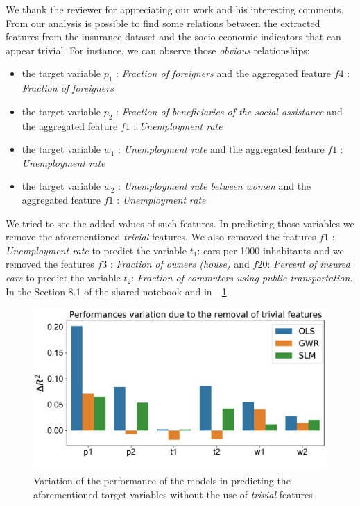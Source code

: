 \documentclass[12pt]{article}
\begin{document}
We thank the reviewer for appreciating our work and his interesting comments. From our analysis is possible to find some relations between the extracted features from the insurance dataset and the socio-economic indicators that can appear trivial. For instance, we can observe those \emph{obvious} relationships:

\begin{itemize}
\item the target variable $p_1$ : \emph{Fraction of foreigners} and the aggregated feature $f4$ : \emph{Fraction of foreigners}
\item the target variable $p_2$ : \emph{Fraction of beneficiaries of the social assistance} and the aggregated feature $f1$ : \emph{Unemployment rate}
\item  the target variable $w_1$ : \emph{Unemployment rate} and the aggregated feature $f1$ : \emph{Unemployment rate}
\item  the target variable $w_2$ : \emph{Unemployment rate between women} and the aggregated feature $f1$ : \emph{Unemployment rate}
\end{itemize}

We tried to see the added values of such features. In predicting those variables we remove the aforementioned \emph{trivial} features. We also removed the features $f1$ : \emph{Unemployment rate} to predict the variable $t_1$: cars per 1000 inhabitants and we removed the features $f3$ : \emph{Fraction of owners (house)} and $f20$: \emph{Percent of insured cars}  to predict the variable $t_2$: \emph{Fraction of commuters using public transportation}. In the Section 8.1 of the shared notebook and in~\figurename~\ref{fig:deltaR2}.


\begin{figure}[h!]
    \centering
    \includegraphics[width=1\linewidth]{figures/deltaR2_new.pdf}
\caption{Variation of the performance of the models in predicting the aforementioned target variables without the use of \emph{trivial} features.}
\label{fig:deltaR2}  
\end{figure}
\end{document}
